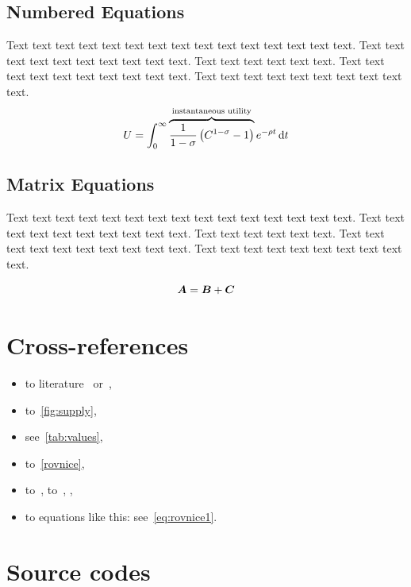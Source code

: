 \subsection{Numbered Equations}

Text text text text text text text text text text text text text text text. Text text text text text text text text text text. Text text text text text text. Text text text text text text text text text text. Text text text text text text text text text text.
\begin{equation}\label{eq:rovnice1}
    U = \int_0^{\infty} \overbrace{ \frac{1}{1-\sigma}\left(C^{1-\sigma} -1 \right)}^\text{instantaneous utility} e^{-\rho t} \,\mathrm{d} t
\end{equation}

\subsection{Matrix Equations}

Text text text text text text text text text text text text text text text. Text text text text text text text text text text. Text text text text text text. Text text text text text text text text text text. Text text text text text text text text text text.

\begin{equation}\label{eq:rovnice2}
    \mbox{\boldmath $A$} = \mbox{\boldmath $B$} + \mbox{\boldmath $C$}
\end{equation}

\section{Cross-references}

\begin{itemize}
    \item to literature~\citep[pg.~10]{Bjorvatn2006} 	
            or~\citet[pg.~10]{Haufler2006},
    \item to~\autoref{fig:supply},														%
    \item see~\autoref{tab:values},
    \item to~\autoref{rovnice},
    \item to~, to~,
            , 
    \item to equations like this: see~\eqref{eq:rovnice1}.
\end{itemize}

\section{Source codes}

